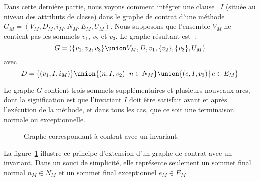 Dans cette dernière partie, nous voyons comment intégrer une clause
\ainvariant~$I$ (située au niveau des attributs de classe) dans le graphe de
contrat d'une méthode $G_M = (V_M, D_M, i_M, N_M, E_M, U_M)$. Nous supposons que
l'ensemble $V_M$ ne contient pas les sommets $v_1$, $v_2$ et $v_3$. Le graphe
résultant est~:
%
$$G = (
  \{v_1, v_2, v_3\} \union V_M,
  D,
  v_1,
  \{v_2\},
  \{v_3\},
  U_M
)$$
%
avec
%
$$D = \{(v_1, I, i_M)\} \union
      \{(n, I, v_2) \,\vert\, n \in N_M\} \union
      \{(e, I, v_3) \,\vert\, e \in E_M\}$$

Le graphe $G$ contient trois sommets supplémentaires et plusieurs nouveaux arcs,
dont la signification est que l'invariant $I$ doit être satisfait avant et après
l'exécution de la méthode, et dans tous les cas, que ce soit une terminaison
normale ou exceptionnelle.

\begin{figure}


\caption{\label{figure:test:invariant_graph} Graphe correspondant à contrat avec
un invariant.}

\end{figure}

\begin{example}

La figure~\ref{figure:test:invariant_graph} illustre ce principe d'extension
d'un graphe de contrat avec un invariant. Dans un souci de simplicité, elle
représente seulement un sommet final normal $n_M \in N_M$ et un sommet final
exceptionnel $e_M \in E_M$.

\end{example}
